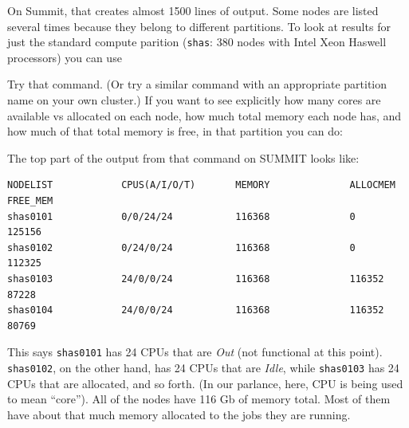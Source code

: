 \documentclass[]{krantz}
\makeatletter
\newenvironment{Shaded}{\begin{snugshade}}{\end{snugshade}}
\newcommand{\ExtensionTok}[1]{#1}
\newcommand{\NormalTok}[1]{#1}
\newenvironment{kframe}{%
\medskip{}
\setlength{\fboxsep}{.8em}
 \def\at@end@of@kframe{}%
 \ifinner\ifhmode%
  \def\at@end@of@kframe{\end{minipage}}%
  \begin{minipage}{\columnwidth}%
 \fi\fi%
 \def\FrameCommand##1{\hskip\@totalleftmargin \hskip-\fboxsep
 \colorbox{shadecolor}{##1}\hskip-\fboxsep
     \hskip-\linewidth \hskip-\@totalleftmargin \hskip\columnwidth}%
 \MakeFramed {\advance\hsize-\width
   \@totalleftmargin\z@ \linewidth\hsize
   \@setminipage}}%
 {\par\unskip\endMakeFramed%
 \at@end@of@kframe}
\renewenvironment{Shaded}{\begin{kframe}}{\end{kframe}}
\makeatother
\begin{document}
\begin{Shaded}
\begin{Highlighting}[]
\ExtensionTok{%
\end{Highlighting}
\end{Shaded}

On Summit, that creates almost 1500 lines of output. Some nodes are listed several times
because they belong to different partitions. To look at results for just the standard compute
parition (\texttt{shas}: 380 nodes with Intel Xeon Haswell processors) you can use

\begin{Shaded}
\begin{Highlighting}[]
\ExtensionTok{%
\end{Highlighting}
\end{Shaded}

Try that command. (Or try a similar command with an appropriate partition name on your
own cluster.) If you want to see explicitly how many cores are available vs allocated
on each node, how much total memory each node has, and how much of that total
memory is free, in that partition you can do:

\begin{Shaded}
\begin{Highlighting}[]
\ExtensionTok{%
\end{Highlighting}
\end{Shaded}

The top part of the output from that command on SUMMIT looks like:

\begin{verbatim}
NODELIST            CPUS(A/I/O/T)       MEMORY              ALLOCMEM            FREE_MEM            
shas0101            0/0/24/24           116368              0                   125156              
shas0102            0/24/0/24           116368              0                   112325              
shas0103            24/0/0/24           116368              116352              87228               
shas0104            24/0/0/24           116368              116352              80769  
\end{verbatim}

This says \texttt{shas0101} has 24 CPUs that are \emph{Out} (not functional at this point).
\texttt{shas0102}, on the other hand, has 24 CPUs that are \emph{Idle}, while \texttt{shas0103} has
24 CPUs that are allocated, and so forth. (In our parlance, here,
CPU is being used to mean ``core''). All of the nodes have
116 Gb of memory total. Most of them have about that much memory allocated to
the jobs they are running.
\end{document}

